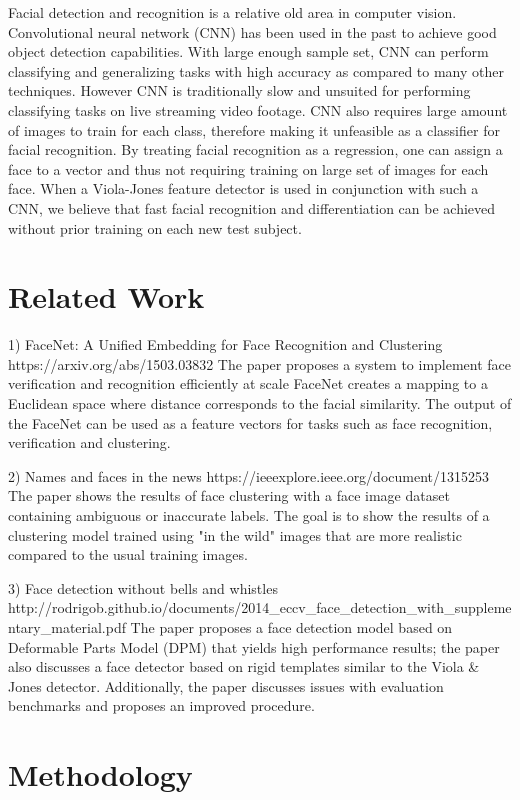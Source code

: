 \documentclass[conference]{IEEEtran}
\begin{document}
Facial detection and recognition is a relative old area in computer vision. Convolutional neural network (CNN) has been used in the past to achieve good object detection capabilities. With large enough sample set, CNN can perform classifying and generalizing tasks with high accuracy as compared to many other techniques. However CNN is traditionally slow and unsuited for performing classifying tasks on live streaming video footage. CNN also requires large amount of images to train for each class, therefore making it unfeasible as a classifier for facial recognition. By treating facial recognition as a regression, one can assign a face to a vector and thus not requiring training on large set of images for each face. When a Viola-Jones feature detector is used in conjunction with such a CNN, we believe that fast facial recognition and differentiation can be achieved without prior training on each new test subject.

\section{Related Work}
1) 	FaceNet: A Unified Embedding for Face Recognition and Clustering
	https://arxiv.org/abs/1503.03832
	The paper proposes a system to implement face verification and recognition efficiently at scale FaceNet 
	creates a mapping to a Euclidean space where distance corresponds to the facial similarity. The output 
	of the FaceNet can be used as a feature vectors for tasks such as face recognition, verification and clustering.
	
2)	Names and faces in the news
	https://ieeexplore.ieee.org/document/1315253
	The paper shows the results of face clustering with a face image dataset containing ambiguous or inaccurate
	labels. The goal is to show the results of a clustering model trained using "in the wild" images that are
	more realistic compared to the usual training images.
	
3)	Face detection without bells and whistles
	http://rodrigob.github.io/documents/2014\_eccv\_face\_detection\linebreak\_with\_supplementary\_material.pdf
	The paper proposes a face detection model based on Deformable Parts Model (DPM) that yields high performance
	results; the paper also discusses a face detector based on rigid templates similar to the Viola \& Jones 
	detector. Additionally, the paper discusses issues with evaluation benchmarks and proposes an improved procedure.


\section{Methodology}
\end{document}

